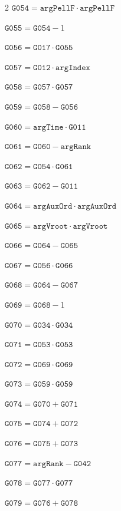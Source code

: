 \documentclass[10pt]{article}
\begin{document}
\begin{multicols}{2}
\noindent $\mathtt{G054}=\mathtt{argPellF}\cdot \mathtt{argPellF}$\par
\noindent $\mathtt{G055}=\mathtt{G054}-1$\par
\noindent $\mathtt{G056}=\mathtt{G017}\cdot \mathtt{G055}$\par
\noindent $\mathtt{G057}=\mathtt{G012}\cdot \mathtt{argIndex}$\par
\noindent $\mathtt{G058}=\mathtt{G057}\cdot \mathtt{G057}$\par
\noindent $\mathtt{G059}=\mathtt{G058}-\mathtt{G056}$\par
\noindent $\mathtt{G060}=\mathtt{argTime}\cdot \mathtt{G011}$\par
\noindent $\mathtt{G061}=\mathtt{G060}-\mathtt{argRank}$\par
\noindent $\mathtt{G062}=\mathtt{G054}\cdot \mathtt{G061}$\par
\noindent $\mathtt{G063}=\mathtt{G062}-\mathtt{G011}$\par
\noindent $\mathtt{G064}=\mathtt{argAuxOrd}\cdot \mathtt{argAuxOrd}$\par
\noindent $\mathtt{G065}=\mathtt{argVroot}\cdot \mathtt{argVroot}$\par
\noindent $\mathtt{G066}=\mathtt{G064}-\mathtt{G065}$\par
\noindent $\mathtt{G067}=\mathtt{G056}\cdot \mathtt{G066}$\par
\noindent $\mathtt{G068}=\mathtt{G064}-\mathtt{G067}$\par
\noindent $\mathtt{G069}=\mathtt{G068}-1$\par
\noindent $\mathtt{G070}=\mathtt{G034}\cdot \mathtt{G034}$\par
\noindent $\mathtt{G071}=\mathtt{G053}\cdot \mathtt{G053}$\par
\noindent $\mathtt{G072}=\mathtt{G069}\cdot \mathtt{G069}$\par
\noindent $\mathtt{G073}=\mathtt{G059}\cdot \mathtt{G059}$\par
\noindent $\mathtt{G074}=\mathtt{G070}+\mathtt{G071}$\par
\noindent $\mathtt{G075}=\mathtt{G074}+\mathtt{G072}$\par
\noindent $\mathtt{G076}=\mathtt{G075}+\mathtt{G073}$\par
\noindent $\mathtt{G077}=\mathtt{argRank}-\mathtt{G042}$\par
\noindent $\mathtt{G078}=\mathtt{G077}\cdot \mathtt{G077}$\par
\noindent $\mathtt{G079}=\mathtt{G076}+\mathtt{G078}$\par

\end{multicols}
\end{document}
